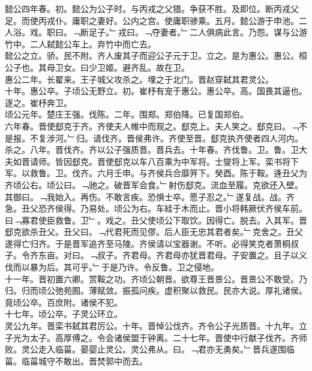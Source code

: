 \documentclass{zhvt-classic}
\begin{document}
\hspace*{2em}懿公四年春。初。懿公为公子时。与丙戎之父猎。争获不胜。及即位。断丙戎父足。而使丙戎仆。庸职之妻好。公内之宫。使庸职骖乘。五月。懿公游于申池。二人浴。戏。职曰。﹁断足子。﹂戎曰。﹁夺妻者。﹂二人俱病此言。乃怨。谋与公游竹中。二人弑懿公车上。弃竹中而亡去。\\
\hspace*{2em}懿公之立。骄。民不附。齐人废其子而迎公子元于卫。立之。是为惠公。惠公。桓公子也。其母卫女。曰少卫姬。避齐乱。故在卫。\\
\hspace*{2em}惠公二年。长翟来。王子城父攻杀之。埋之于北门。晋赵穿弑其君灵公。\\
\hspace*{2em}十年。惠公卒。子顷公无野立。初。崔杼有宠于惠公。惠公卒。高。国畏其逼也。逐之。崔杼奔卫。\\
\hspace*{2em}顷公元年。楚庄王强。伐陈。二年。围郑。郑伯降。已复国郑伯。\\
\hspace*{2em}六年春。晋使郄克于齐。齐使夫人帷中而观之。郄克上。夫人笑之。郄克曰。﹁不是报。不复涉河。﹂归。请伐齐。晋侯弗许。齐使至晋。郄克执齐使者四人河内。杀之。八年。晋伐齐。齐以公子强质晋。晋兵去。十年春。齐伐鲁。卫。鲁。卫大夫如晋请师。皆因郄克。晋使郄克以车八百乘为中军将。士燮将上军。栾书将下军。以救鲁。卫。伐齐。六月壬申。与齐侯兵合靡笄下。癸酉。陈于鞍。逄丑父为齐顷公右。顷公曰。﹁驰之。破晋军会食。﹂射伤郄克。流血至履。克欲还入壁。其御曰。﹁我始入。再伤。不敢言疾。恐惧士卒。愿子忍之。﹂遂复战。战。齐急。丑父恐齐侯得。乃易处。顷公为右。车絓于木而止。晋小将韩厥伏齐侯车前。曰﹁寡君使臣救鲁。卫﹂。戏之。丑父使顷公下取饮。因得亡。脱去。入其军。晋郄克欲杀丑父。丑父曰。﹁代君死而见僇。后人臣无忠其君者矣。﹂克舍之。丑父遂得亡归齐。于是晋军追齐至马陵。齐侯请以宝器谢。不听。必得笑克者萧桐叔子。令齐东亩。对曰。﹁叔子。齐君母。齐君母亦犹晋君母。子安置之。且子以义伐而以暴为后。其可乎。﹂于是乃许。令反鲁。卫之侵地。\\
\hspace*{2em}十一年。晋初置六卿。赏鞍之功。齐顷公朝晋。欲尊王晋景公。晋景公不敢受。乃归。归而顷公弛苑囿。薄赋敛。振孤问疾。虚积聚以救民。民亦大说。厚礼诸侯。竟顷公卒。百庶附。诸侯不犯。\\
\hspace*{2em}十七年。顷公卒。子灵公环立。\\
\hspace*{2em}灵公九年。晋栾书弑其君厉公。十年。晋悼公伐齐。齐令公子光质晋。十九年。立子光为太子。高厚傅之。令会诸侯盟于钟离。二十七年。晋使中行献子伐齐。齐师败。灵公走入临菑。晏婴止灵公。灵公弗从。曰。﹁君亦无勇矣。﹂晋兵遂围临菑。临菑城守不敢出。晋焚郭中而去。\\
\end{document}
